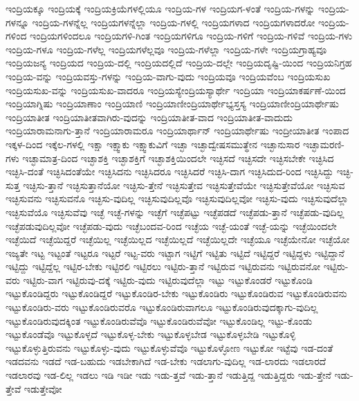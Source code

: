 {ಇಂದ್ರಿಯಕ್ಕೂ
ಇಂದ್ರಿಯಕ್ಕೆ
ಇಂದ್ರಿಯಕ್ರಿಯೆಗಳಲ್ಲಿಯೂ
ಇಂದ್ರಿಯ-ಗಳ
ಇಂದ್ರಿಯಗ-ಳಂತೆ
ಇಂದ್ರಿಯ-ಗಳನ್ನು
ಇಂದ್ರಿಯ-ಗಳನ್ನೂ
ಇಂದ್ರಿಯ-ಗಳನ್ನೆಲ್ಲ
ಇಂದ್ರಿಯಗಳನ್ನೆಲ್ಲಾ
ಇಂದ್ರಿಯ-ಗಳಲ್ಲಿ
ಇಂದ್ರಿಯಗಳಾದ
ಇಂದ್ರಿಯಗಳಾದರೋ
ಇಂದ್ರಿಯ-ಗಳಿಂದ
ಇಂದ್ರಿಯಗಳಿಂದಲೂ
ಇಂದ್ರಿಯಗಳಿ-ಗಿಂತ
ಇಂದ್ರಿಯಗಳಿಗೂ
ಇಂದ್ರಿಯ-ಗಳಿಗೆ
ಇಂದ್ರಿಯ-ಗಳಿವೆ
ಇಂದ್ರಿಯ-ಗಳು
ಇಂದ್ರಿಯ-ಗಳೂ
ಇಂದ್ರಿಯ-ಗಳೆಲ್ಲ
ಇಂದ್ರಿಯಗಳೆಲ್ಲವೂ
ಇಂದ್ರಿಯ-ಗಳೆಲ್ಲಾ
ಇಂದ್ರಿಯ-ಗಳೇ
ಇಂದ್ರಿಯಗ್ರಾಹ್ಯವೂ
ಇಂದ್ರಿಯಜನ್ಯ
ಇಂದ್ರಿಯದ
ಇಂದ್ರಿಯ-ದಲ್ಲಿ
ಇಂದ್ರಿಯದಲ್ಲಿದೆ
ಇಂದ್ರಿಯ-ದಲ್ಲೇ
ಇಂದ್ರಿಯದೃಷ್ಟಿ-ಯಿಂದ
ಇಂದ್ರಿಯನಿಗ್ರಹ
ಇಂದ್ರಿಯ-ವನ್ನು
ಇಂದ್ರಿಯವಸ್ತು-ಗಳನ್ನು
ಇಂದ್ರಿಯ-ವಾಗು-ವುದು
ಇಂದ್ರಿಯವೂ
ಇಂದ್ರಿಯವೆಂಬ
ಇಂದ್ರಿಯಸುಖ
ಇಂದ್ರಿಯಸುಖ-ವನ್ನು
ಇಂದ್ರಿಯಸುಖ-ವಾದರೂ
ಇಂದ್ರಿಯಸ್ಯೇಂದ್ರಿಯಸ್ಯಾರ್ಥೇ
ಇಂದ್ರಿಯಾ
ಇಂದ್ರಿಯಾಕರ್ಷಣೆ-ಯಿಂದ
ಇಂದ್ರಿಯಾಗ್ನಿಷು
ಇಂದ್ರಿಯಾಣಾಂ
ಇಂದ್ರಿಯಾಣಿ
ಇಂದ್ರಿಯಾಣೀಂದ್ರಿಯಾರ್ಥೇಭ್ಯಸ್ತಸ್ಯ
ಇಂದ್ರಿಯಾಣೀಂದ್ರಿಯಾರ್ಥೇಷು
ಇಂದ್ರಿಯಾತೀತ
ಇಂದ್ರಿಯಾತೀತವಾಗಿರು-ವುದನ್ನು
ಇಂದ್ರಿಯಾತೀತ-ವಾದ
ಇಂದ್ರಿಯಾತೀತ-ವಾದುದು
ಇಂದ್ರಿಯಾರಾಮನಾಗು-ತ್ತಾನೆ
ಇಂದ್ರಿಯಾರಾಮರೂ
ಇಂದ್ರಿಯಾರ್ಥಾನ್
ಇಂದ್ರಿಯಾರ್ಥೇಷು
ಇಂದ್ರೀಯಾತೀತ
ಇಂಪಾದ
ಇಕ್ಕಳ-ದಿಂದ
ಇಕ್ಕೆಲ-ಗಳಲ್ಲಿ
ಇಕ್ಷಾ
ಇಕ್ಷ್ವಾಕು
ಇಕ್ಷ್ವಾಕುವಿಗೆ
ಇಚ್ಛಾ
ಇಚ್ಛಾದ್ವೇಷಸಮುತ್ಥೇನ
ಇಚ್ಛಾನುಸಾರ
ಇಚ್ಛಾಮರಣಿ-ಗಳು
ಇಚ್ಛಾಮಾತ್ರ-ದಿಂದ
ಇಚ್ಛಾಶಕ್ತಿ
ಇಚ್ಛಾಶಕ್ತಿಗೆ
ಇಚ್ಛಾಶಕ್ತಿಯಿಂದಲೇ
ಇಚ್ಛಿಸದೆ
ಇಚ್ಛಿಸದೇ
ಇಚ್ಛಿಸಬೇಕೇ
ಇಚ್ಛಿಸಿದ
ಇಚ್ಛಿಸಿ-ದಂತೆ
ಇಚ್ಛಿಸಿದಂತೆಯೇ
ಇಚ್ಛಿಸಿದನು
ಇಚ್ಛಿಸಿದರೂ
ಇಚ್ಛಿಸಿದರೆ
ಇಚ್ಛಿಸಿ-ದಾಗ
ಇಚ್ಛಿಸಿದುದ-ರಿಂದ
ಇಚ್ಛಿಸಿದ್ದು
ಇಚ್ಛಿ-ಸುತ್ತ
ಇಚ್ಛಿಸು-ತ್ತಾನೆ
ಇಚ್ಛಿಸುತ್ತಾನೆಯೋ
ಇಚ್ಛಿಸು-ತ್ತೇನೆ
ಇಚ್ಛಿಸುತ್ತೇವ
ಇಚ್ಛಿಸುತ್ತೇವೆಯೇ
ಇಚ್ಛಿಸುತ್ತೇವೆಯೋ
ಇಚ್ಛಿಸುವ
ಇಚ್ಛಿಸುವನು
ಇಚ್ಛಿಸುವನೊ
ಇಚ್ಛಿಸು-ವುದಿಲ್ಲ
ಇಚ್ಛಿಸುವುದಿಲ್ಲವೊ
ಇಚ್ಛಿಸುವುದಿಲ್ಲವೋ
ಇಚ್ಛಿಸು-ವುದು
ಇಚ್ಛಿಸುವುದೆಲ್ಲಾ
ಇಚ್ಛಿಸುವೆಯೊ
ಇಚ್ಛಿಸುವೆವು
ಇಚ್ಛೆ
ಇಚ್ಛೆ-ಗಳನ್ನು
ಇಚ್ಛೆಗೆ
ಇಚ್ಛೆಪಟ್ಟು
ಇಚ್ಛೆಪಡದೆ
ಇಚ್ಛೆಪಡು-ತ್ತಾನೆ
ಇಚ್ಛೆಪಡು-ವುದಿಲ್ಲ
ಇಚ್ಛೆಪಡುವುದಿಲ್ಲವೋ
ಇಚ್ಛೆಪಡು-ವುದು
ಇಚ್ಛೆಬಂದವ-ರಿಂದ
ಇಚ್ಛೆಯ
ಇಚ್ಛೆ-ಯಂತೆ
ಇಚ್ಛೆ-ಯನ್ನು
ಇಚ್ಛೆಯಿಂದಲೇ
ಇಚ್ಛೆಯಿದೆ
ಇಚ್ಛೆಯಿದ್ದರೆ
ಇಚ್ಛೆಯಿಲ್ಲ
ಇಚ್ಛೆಯಿಲ್ಲದ
ಇಚ್ಛೆಯಿಲ್ಲದೆ
ಇಚ್ಛೆಯಿಲ್ಲದೇ
ಇಚ್ಛೆಯೂ
ಇಚ್ಛೆಯೇನೋ
ಇಚ್ಛೆಯೋ
ಇಜ್ಯತೇ
ಇಟ್ಟ
ಇಟ್ಟಂತೆ
ಇಟ್ಟರೂ
ಇಟ್ಟರೆ
ಇಟ್ಟ-ವರು
ಇಟ್ಟಾಗ
ಇಟ್ಟಿಗೆ
ಇಟ್ಟಿತು
ಇಟ್ಟಿದೆ
ಇಟ್ಟಿದ್ದರೆ
ಇಟ್ಟಿದ್ದಳು
ಇಟ್ಟಿದ್ದಾನೆ
ಇಟ್ಟಿದ್ದು
ಇಟ್ಟಿದ್ದೆಲ್ಲ
ಇಟ್ಟಿರ-ಬೇಕು
ಇಟ್ಟಿರಲಿ
ಇಟ್ಟಿರಲು
ಇಟ್ಟಿರು-ತ್ತಾನೆ
ಇಟ್ಟಿರುವ
ಇಟ್ಟಿರುವನು
ಇಟ್ಟಿರುವನೋ
ಇಟ್ಟಿರು-ವರು
ಇಟ್ಟಿರು-ವಾಗ
ಇಟ್ಟಿರುವು-ದಕ್ಕೆ
ಇಟ್ಟಿರು-ವುದು
ಇಟ್ಟಿರುವುದೆಲ್ಲಾ
ಇಟ್ಟು
ಇಟ್ಟುಕೊಂಡರೆ
ಇಟ್ಟುಕೊಂಡಿ
ಇಟ್ಟುಕೊಂಡಿದ್ದರು
ಇಟ್ಟುಕೊಂಡಿದ್ದರೆ
ಇಟ್ಟುಕೊಂಡಿರ-ಬೇಕು
ಇಟ್ಟುಕೊಂಡಿರು
ಇಟ್ಟುಕೊಂಡಿರುವ
ಇಟ್ಟುಕೊಂಡಿರುವನು
ಇಟ್ಟುಕೊಂಡಿರು-ವರು
ಇಟ್ಟುಕೊಂಡಿರುವರೊ
ಇಟ್ಟುಕೊಂಡಿರುವಾಗಲೂ
ಇಟ್ಟುಕೊಂಡಿರುವುದಕ್ಕಾಗು-ವುದಿಲ್ಲ
ಇಟ್ಟುಕೊಂಡಿರುವುದಕ್ಕಿಂತ
ಇಟ್ಟುಕೊಂಡಿರುವೆವೊ
ಇಟ್ಟುಕೊಂಡಿರುವೆವೋ
ಇಟ್ಟುಕೊಂಡಿಲ್ಲ
ಇಟ್ಟು-ಕೊಂಡು
ಇಟ್ಟುಕೊಂಡೆವೊ
ಇಟ್ಟುಕೊಳ್ಳದೆ
ಇಟ್ಟುಕೊಳ್ಳ-ಬೇಕು
ಇಟ್ಟುಕೊಳ್ಳಬೇಡ
ಇಟ್ಟುಕೊಳ್ಳಬೇಡಿ
ಇಟ್ಟುಕೊಳ್ಳಿ
ಇಟ್ಟುಕೊಳ್ಳುತ್ತಿರುವನು
ಇಟ್ಟುಕೊಳ್ಳು-ವುದು
ಇಟ್ಟುಕೊಳ್ಳುವೆವೊ
ಇಟ್ಟುಕೊಳ್ಳೋಣ
ಇಟ್ಟುಕೋ
ಇಟ್ಟೆವು
ಇಡ-ದಂತೆ
ಇಡದವನು
ಇಡದೆ
ಇಡ-ಬಹುದು
ಇಡಬೇಕಾಗಿದೆ
ಇಡ-ಬೇಕು
ಇಡಲಾಗು-ವುದಿಲ್ಲ
ಇಡ-ಲಾರದು
ಇಡಲಾರದೆ
ಇಡಲಾರವು
ಇಡ-ಲಿಲ್ಲ
ಇಡಲು
ಇಡಿ
ಇಡೀ
ಇಡು
ಇಡು-ತ್ತವೆ
ಇಡು-ತ್ತಾನೆ
ಇಡುತ್ತಿದ್ದ
ಇಡುತ್ತಿದ್ದರು
ಇಡು-ತ್ತೇನೆ
ಇಡು-ತ್ತೇವೆ
ಇಡುತ್ತೇವೋ
}

